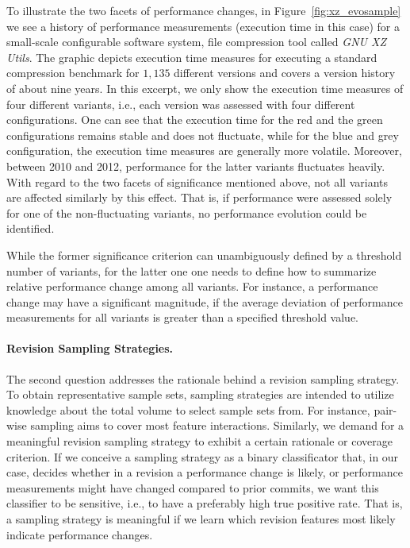 To illustrate the two facets of performance changes, in
Figure~\ref{fig:xz_evosample} we see a history of performance measurements (execution time in this case) for a
small-scale configurable software system, file compression tool called \emph{GNU
XZ Utils}. The graphic depicts execution time measures for executing a standard
compression benchmark for $1,135$ different versions and covers a version
history of about nine years. In this excerpt, we only show the execution time measures
of four different variants, i.e., each version was assessed with four different
configurations. One can see that the execution time for the red and the green
configurations remains stable and does not fluctuate, while for the blue and
grey configuration, the execution time measures are generally more volatile.
Moreover, between 2010 and 2012, performance for the latter variants fluctuates
heavily. With regard to the two facets of significance mentioned above, not all
variants are affected similarly by this effect. That is, if performance were
assessed solely for one of the non-fluctuating variants, no performance
evolution could be identified.

While the former significance criterion can unambiguously defined by a threshold
number of variants, for the latter one one needs to define how to summarize
relative performance change among all variants. For instance, a performance
change may have a significant magnitude, if the average deviation of
performance measurements for all variants is greater than a specified threshold
value.

\paragraph{Revision Sampling Strategies.} The second question addresses the
rationale behind a revision sampling strategy. To obtain representative sample sets, sampling
strategies are intended to utilize knowledge about the total volume to select
sample sets from. For instance, pair-wise sampling aims to cover most feature
interactions. Similarly, we demand for a meaningful revision sampling strategy
to exhibit a certain rationale or coverage criterion. If we conceive a sampling
strategy as a binary classificator that, in our case, decides whether in a
revision a performance change is likely, or performance measurements might have
changed compared to prior commits, we want  this classifier to be sensitive,
i.e., to have a preferably high true positive rate. That is, a sampling
strategy is meaningful if we learn which revision features most likely indicate
performance changes.\\

